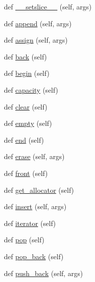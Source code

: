\begin{DoxyCompactItemize}
def \hyperlink{classstructural_1_1_str_double_vector_a1b69a37273df440a2ea6df0d6fa66778}{\+\_\+\+\_\+setslice\+\_\+\+\_\+} (self, args)
\item 
def \hyperlink{classstructural_1_1_str_double_vector_aee91ee1708a78d10fff08c66011e7b4f}{append} (self, args)
\item 
def \hyperlink{classstructural_1_1_str_double_vector_a0d01f1e354429bc497f368f0d5a9a87c}{assign} (self, args)
\item 
def \hyperlink{classstructural_1_1_str_double_vector_ae8fafbf1fc5fd3c9b2f7acc02904917f}{back} (self)
\item 
def \hyperlink{classstructural_1_1_str_double_vector_a21fe7778bcab476ad2376fb44d8b6846}{begin} (self)
\item 
def \hyperlink{classstructural_1_1_str_double_vector_ac68dd174e9e35609729bc9b444dbd362}{capacity} (self)
\item 
def \hyperlink{classstructural_1_1_str_double_vector_a929b54d72ef5707aa9915af334765c96}{clear} (self)
\item 
def \hyperlink{classstructural_1_1_str_double_vector_aff8abdc55be418fc72ee06f2f1fb6ddf}{empty} (self)
\item 
def \hyperlink{classstructural_1_1_str_double_vector_a14882e67d30ca0b38f57d365c01efeee}{end} (self)
\item 
def \hyperlink{classstructural_1_1_str_double_vector_ad19a5b24048291b6b69e027be07fd638}{erase} (self, args)
\item 
def \hyperlink{classstructural_1_1_str_double_vector_a1b27e092f107ea1e18caf7998d647396}{front} (self)
\item 
def \hyperlink{classstructural_1_1_str_double_vector_a896799cafc2aab6b6ca5d532cede4ad3}{get\+\_\+allocator} (self)
\item 
def \hyperlink{classstructural_1_1_str_double_vector_a93793c8d21196945758d531c233e4329}{insert} (self, args)
\item 
def \hyperlink{classstructural_1_1_str_double_vector_a057e7ee4ba98b5d58fb407667ba95697}{iterator} (self)
\item 
def \hyperlink{classstructural_1_1_str_double_vector_a71e9d111fcf61738089465d34e4a2927}{pop} (self)
\item 
def \hyperlink{classstructural_1_1_str_double_vector_a7283c3d911099bce9ae00c3010c1121b}{pop\+\_\+back} (self)
\item 
def \hyperlink{classstructural_1_1_str_double_vector_a79f178e234c41d2971d58312671f66e0}{push\+\_\+back} (self, args)
\item 

\end{DoxyCompactItemize}
